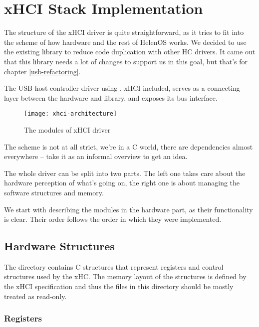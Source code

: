 \chapter{xHCI Stack Implementation}

The structure of the xHCI driver is quite straightforward, as it tries to fit
into the scheme of how hardware and the rest of HelenOS works. We decided to
use the existing library  to reduce code duplication with
other HC drivers. It came out that this library needs a lot of changes to
support us in this goal, but that's for chapter \ref{usb-refactoring}.

The USB host controller driver using , xHCI included, serves as
a connecting layer between the hardware and library, and exposes its bus
interface.

\begin{figure}[h]
	\centering
	\texttt{[image: xhci-architecture]}
	\caption{The modules of xHCI driver}
\end{figure}

The scheme is not at all strict, we're in a C world, there are dependencies
almost everywhere -- take it as an informal overview to get an idea.

The whole driver can be split into two parts. The left one takes care about the
hardware perception of what's going on, the right one is about managing the
software structures and memory.

We start with describing the modules in the hardware part, as their
functionality is clear. Their order follows the order in which they were
implemented.

\section{Hardware Structures}

The  directory contains C structures
that represent registers and control structures used by the xHC. The memory layout of the
structures is defined by the xHCI specification and thus the files in this directory should
be mostly treated as read-only.

\subsection{Registers}

